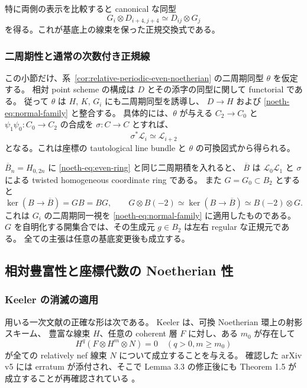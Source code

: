 特に両側の表示を比較すると canonical な同型
\begin{equation}\label{noeth-eq:normal-commutation}
 G_i\otimes D_{i+4,j+4}\simeq D_{ij}\otimes G_j
\end{equation}
を得る。これが基底上の線束を保った正規交換式である。

\subsubsection{二周期性と通常の次数付き正規線}

この小節だけ、系~\ref{cor:relative-periodic-even-noetherian} の二周期同型 $\theta$ を仮定する。
相対 point scheme の構成は $D$ とその添字の同型に関して functorial である。
従って $\theta$ は $H$, $K$, $G_i$ にも二周期同型を誘導し、
$D\to H$ および \eqref{noeth-eq:normal-family} と整合する。
具体的には、$\theta$ が与える $C_2\to C_0$ と
$\psi_1\psi_0:C_0\to C_2$ の合成を $\sigma:C\to C$ とすれば、
\[
 \sigma^*\mathcal L_i\simeq\mathcal L_{i+2}
\]
となる。これは座標の tautological line bundle と $\theta$ の可換図式から得られる。

$\overline B_n=H_{0,2n}$ に \eqref{noeth-eq:even-ring} と同じ二周期積を入れると、
$\overline B$ は $\mathcal L_0\mathcal L_1$ と $\sigma$ による twisted homogeneous coordinate ring である。
また $G=G_0\subset B_2$ とすると
\begin{equation}\label{noeth-eq:graded-normal-line}
 \ker(B\to\overline B)=GB=BG,
 \qquad G\otimes B(-2)\simeq\ker(B\to\overline B)\simeq B(-2)\otimes G.
\end{equation}
これは $G_i$ の二周期同一視を \eqref{noeth-eq:normal-family} に適用したものである。
$G$ を自明化する開集合では、その生成元 $g\in B_2$ は左右 regular な正規元である。
全ての主張は任意の基底変更後も成立する。

\subsection{相対豊富性と座標代数の Noetherian 性}

\subsubsection{Keeler の消滅の適用}

用いる一次文献の正確な形は次である。
Keeler \cite[Theorem 1.5]{Keeler2003} は、可換 Noetherian 環上の射影スキーム、
豊富な線束 $H$、任意の coherent 層 $F$ に対し、ある $m_0$ が存在して
\begin{equation}\label{noeth-eq:keeler}
 H^q(F\otimes H^m\otimes N)=0
 \quad(q>0, m\ge m_0)
\end{equation}
が全ての relatively nef 線束 $N$ について成立することを与える。
確認した arXiv v5 には erratum が添付され、そこで Lemma 3.3 の修正後にも
Theorem 1.5 が成立することが再確認されている
\cite[付属 Erratum, \S2]{Keeler2003}。

